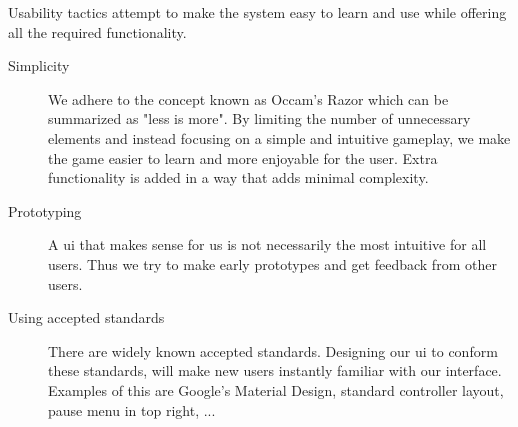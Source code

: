 	Usability tactics attempt to make the system easy to learn and use while offering all the required functionality.

		\begin{description}
			\item[Simplicity]
			We adhere to the concept known as Occam's Razor which can be summarized as "less is more". By limiting the number of unnecessary elements and instead focusing on a simple and intuitive gameplay, we make the game easier to learn and more enjoyable for the user. Extra functionality is added in a way that adds minimal complexity.

			\item[Prototyping]
			A \gls{ui} that makes sense for us is not necessarily the most intuitive for all users. Thus we try to make early prototypes and get feedback from other users.

			\item[Using accepted standards]
			There are widely known accepted standards. Designing our \gls{ui} to conform these standards, will make new users instantly familiar with our interface. Examples of this are Google's Material Design, standard controller layout, pause menu in top right, ...

		\end{description}
